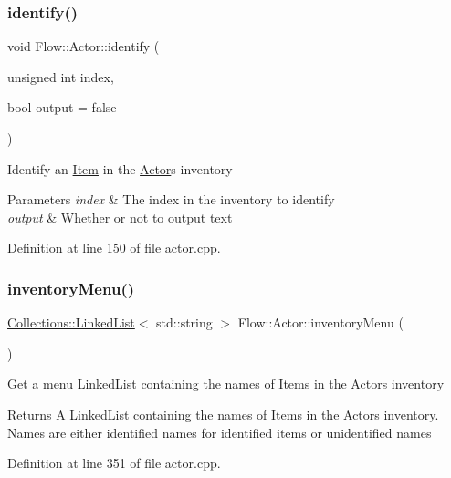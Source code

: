 \subsubsection{\texorpdfstring{identify()}{identify()}}
{\footnotesize\ttfamily void Flow\+::\+Actor\+::identify (\begin{DoxyParamCaption}\item[{unsigned int}]{index,  }\item[{bool}]{output = {\ttfamily false} }\end{DoxyParamCaption})}

Identify an \hyperlink{class_flow_1_1_item}{Item} in the \hyperlink{class_flow_1_1_actor}{Actor}\textquotesingle{}s inventory 
\begin{DoxyParams}{Parameters}
{\em index} & The index in the inventory to identify \\
\hline
{\em output} & Whether or not to output text \\
\hline
\end{DoxyParams}


Definition at line 150 of file actor.\+cpp.

\hypertarget{class_flow_1_1_actor_a57fa1f3f670561fbca7ad13ad6a6f35f}{}\label{class_flow_1_1_actor_a57fa1f3f670561fbca7ad13ad6a6f35f} 
\subsubsection{\texorpdfstring{inventory\+Menu()}{inventoryMenu()}}
{\footnotesize\ttfamily \hyperlink{class_collections_1_1_linked_list}{Collections\+::\+Linked\+List}$<$ std\+::string $>$ Flow\+::\+Actor\+::inventory\+Menu (\begin{DoxyParamCaption}{ }\end{DoxyParamCaption})}

Get a menu Linked\+List containing the names of Items in the \hyperlink{class_flow_1_1_actor}{Actor}\textquotesingle{}s inventory \begin{DoxyReturn}{Returns}
A Linked\+List containing the names of Items in the \hyperlink{class_flow_1_1_actor}{Actor}\textquotesingle{}s inventory. Names are either identified names for identified items or unidentified names 
\end{DoxyReturn}


Definition at line 351 of file actor.\+cpp.

